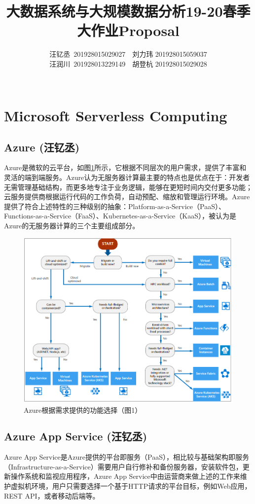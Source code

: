 \documentclass[11pt]{article}
\title{大数据系统与大规模数据分析19-20春季大作业Proposal}
\author{汪钇丞\ 201928015029027\ \ 刘力玮 201928015059037 \\
		汪润川\ 201928013229149\ \ 胡登杭 201928015029028 \\
	\Name\ \ \SID}
\date{}
\begin{document}
\maketitle

\section{Microsoft Serverless Computing}
\subsection{Azure (汪钇丞)}
Azure是微软的云平台，如图\ref{figs:Overview}所示，它根据不同层次的用户需求，提供了丰富和灵活的端到端服务\cite{overview}。Azure认为无服务器计算最主要的特点也是优点在于：开发者无需管理基础结构，而更多地专注于业务逻辑，能够在更短时间内交付更多功能；云服务提供商根据运行代码的工作负荷，自动预配、缩放和管理运行环境。Azure提供了符合上述特性的三种级别的抽象：Platform-as-a-Service（PaaS）、Functions-as-a-Service（FaaS）、Kubernetes-as-a-Service（KaaS），被认为是Azure的无服务器计算的三个主要组成部分。
\begin{figure}[!htbp]
	\centering
	\includegraphics[scale=0.5]{figs/AzureChoice.PNG}
	\caption{Azure根据需求提供的功能选择（\cite{overview}图1）}
	\label{figs:Overview}
\end{figure}

\subsection{Azure App Service (汪钇丞)}
Azure App Service是Azure提供的平台即服务（PaaS），相比较与基础架构即服务（Infrastructure-as-a-Service）需要用户自行修补和备份服务器，安装软件包，更新操作系统和监视应用程序，Azure App Service中由运营商来做上述的工作来维护虚拟机环境，用户只需要选择一个基于HTTP请求的平台目标，例如Web应用，REST API，或者移动后端等。
\end{document}
